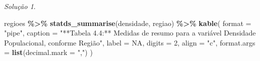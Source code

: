 \documentclass[
]{latex/krantz}
\newenvironment{Shaded}{\begin{snugshade}}{\end{snugshade}}
\newcommand{\AttributeTok}[1]{\textcolor[rgb]{0.13,0.29,0.53}{#1}}
\newcommand{\ConstantTok}[1]{\textcolor[rgb]{0.56,0.35,0.01}{#1}}
\newcommand{\DecValTok}[1]{\textcolor[rgb]{0.00,0.00,0.81}{#1}}
\newcommand{\FunctionTok}[1]{\textcolor[rgb]{0.13,0.29,0.53}{\textbf{#1}}}
\newcommand{\NormalTok}[1]{#1}
\newcommand{\SpecialCharTok}[1]{\textcolor[rgb]{0.81,0.36,0.00}{\textbf{#1}}}
\newcommand{\StringTok}[1]{\textcolor[rgb]{0.31,0.60,0.02}{#1}}
\theoremstyle{definition}
\theoremstyle{definition}
\theoremstyle{definition}
\theoremstyle{definition}
\theoremstyle{remark}
\newtheorem*{solution}{Solução}
\begin{document}
\begin{solution}
\begin{Shaded}
\begin{Highlighting}[]
\NormalTok{regioes }\SpecialCharTok{\%\textgreater{}\%}
  \FunctionTok{statds\_summarise}\NormalTok{(densidade, regiao) }\SpecialCharTok{\%\textgreater{}\%}
  \FunctionTok{kable}\NormalTok{(}
    \AttributeTok{format =} \StringTok{"pipe"}\NormalTok{,}
    \AttributeTok{caption =} \StringTok{"**Tabela 4.4:** Medidas de resumo para a variável \textasciigrave{}Densidade Populacional\textasciigrave{}, conforme \textasciigrave{}Região\textasciigrave{}"}\NormalTok{,}
    \AttributeTok{label =} \ConstantTok{NA}\NormalTok{,}
    \AttributeTok{digits =} \DecValTok{2}\NormalTok{,}
    \AttributeTok{align =} \StringTok{"c"}\NormalTok{,}
    \AttributeTok{format.args =} \FunctionTok{list}\NormalTok{(}\AttributeTok{decimal.mark =} \StringTok{","}\NormalTok{)}
\NormalTok{  )}
\end{Highlighting}
\end{Shaded}


\end{solution}
\end{document}
